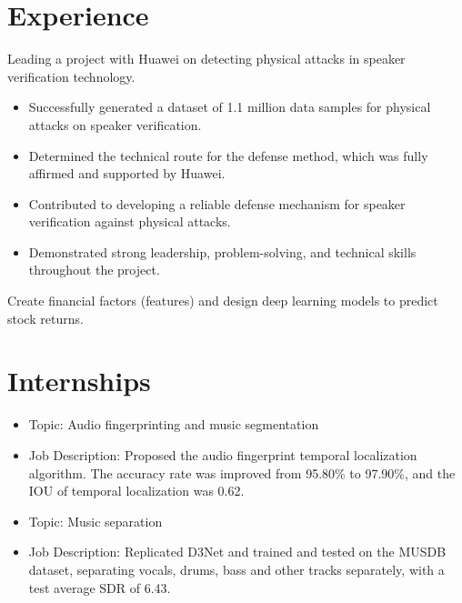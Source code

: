\documentclass{resume}
\begin{document}
\section{Experience}
{\small {}}
Leading a project with Huawei on detecting physical attacks in speaker verification technology.
\begin{itemize}
    \item Successfully generated a dataset of 1.1 million data samples for physical attacks on speaker verification.
    \item Determined the technical route for the defense method, which was fully affirmed and supported by Huawei.
    \item Contributed to developing a reliable defense mechanism for speaker verification against physical attacks.
    \item Demonstrated strong leadership, problem-solving, and technical skills throughout the project.
\end{itemize}


{\small {}}
Create financial factors (features) and design deep learning models to predict stock returns.


\section{Internships}
\begin{itemize}
    \item Topic: Audio fingerprinting and music segmentation
    \item Job Description: Proposed the audio fingerprint temporal localization algorithm. The accuracy rate was improved from 95.80\% to 97.90\%, and the IOU of temporal localization was 0.62.
\end{itemize}

\begin{itemize}
    \item Topic: Music separation
    \item Job Description: Replicated D3Net and trained and tested on the MUSDB dataset, separating vocals, drums, bass and other
tracks separately, with a test average SDR of 6.43.
\end{itemize}
\end{document}
